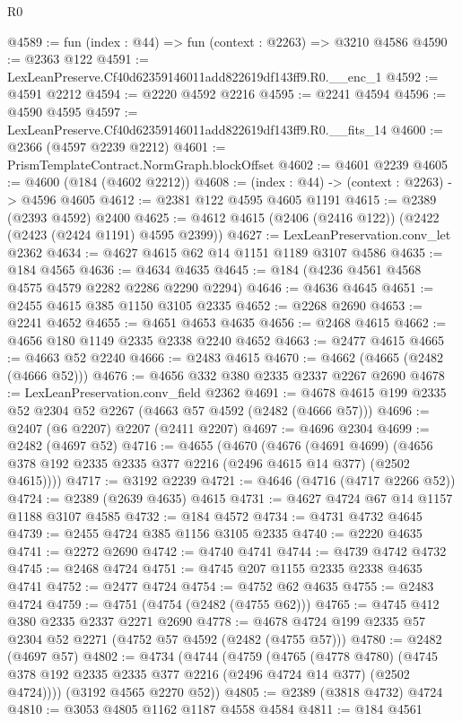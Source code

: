 \begin{lexlean}{R0}
\begin{coremodule}
@4589 := fun (index : @44) => fun (context : @2263) => @3210 @4586
@4590 := @2363 @122
@4591 := LexLeanPreserve.Cf40d62359146011add822619df143ff9.R0.__enc_1
@4592 := @4591 @2212
@4594 := @2220 @4592 @2216
@4595 := @2241 @4594
@4596 := @4590 @4595
@4597 := LexLeanPreserve.Cf40d62359146011add822619df143ff9.R0.__fits_14
@4600 := @2366 (@4597 @2239 @2212)
@4601 := PrismTemplateContract.NormGraph.blockOffset
@4602 := @4601 @2239
@4605 := @4600 (@184 (@4602 @2212))
@4608 := (index : @44) -> (context : @2263) -> @4596 @4605
@4612 := @2381 @122 @4595 @4605 @1191
@4615 := @2389 (@2393 @4592) @2400
@4625 := @4612 @4615 (@2406 (@2416 @122)) (@2422 (@2423 (@2424 @1191) @4595 @2399))
@4627 := LexLeanPreservation.conv_let @2362
@4634 := @4627 @4615 @62 @14 @1151 @1189 @3107 @4586
@4635 := @184 @4565
@4636 := @4634 @4635
@4645 := @184 (@4236 @4561 @4568 @4575 @4579 @2282 @2286 @2290 @2294)
@4646 := @4636 @4645
@4651 := @2455 @4615 @385 @1150 @3105 @2335
@4652 := @2268 @2690
@4653 := @2241 @4652
@4655 := @4651 @4653 @4635
@4656 := @2468 @4615
@4662 := @4656 @180 @1149 @2335 @2338 @2240 @4652
@4663 := @2477 @4615
@4665 := @4663 @52 @2240
@4666 := @2483 @4615
@4670 := @4662 (@4665 (@2482 (@4666 @52)))
@4676 := @4656 @332 @380 @2335 @2337 @2267 @2690
@4678 := LexLeanPreservation.conv_field @2362
@4691 := @4678 @4615 @199 @2335 @52 @2304 @52 @2267 (@4663 @57 @4592 (@2482 (@4666 @57)))
@4696 := @2407 (@6 @2207) @2207 (@2411 @2207)
@4697 := @4696 @2304
@4699 := @2482 (@4697 @52)
@4716 := @4655
    (@4670
      (@4676
        (@4691 @4699)
        (@4656 @378 @192 @2335 @2335 @377 @2216 (@2496 @4615 @14 @377) (@2502 @4615))))
@4717 := @3192 @2239
@4721 := @4646 (@4716 (@4717 @2266 @52))
@4724 := @2389 (@2639 @4635) @4615
@4731 := @4627 @4724 @67 @14 @1157 @1188 @3107 @4585
@4732 := @184 @4572
@4734 := @4731 @4732 @4645
@4739 := @2455 @4724 @385 @1156 @3105 @2335
@4740 := @2220 @4635
@4741 := @2272 @2690
@4742 := @4740 @4741
@4744 := @4739 @4742 @4732
@4745 := @2468 @4724
@4751 := @4745 @207 @1155 @2335 @2338 @4635 @4741
@4752 := @2477 @4724
@4754 := @4752 @62 @4635
@4755 := @2483 @4724
@4759 := @4751 (@4754 (@2482 (@4755 @62)))
@4765 := @4745 @412 @380 @2335 @2337 @2271 @2690
@4778 := @4678 @4724 @199 @2335 @57 @2304 @52 @2271 (@4752 @57 @4592 (@2482 (@4755 @57)))
@4780 := @2482 (@4697 @57)
@4802 := @4734
    (@4744
      (@4759
        (@4765
          (@4778 @4780)
          (@4745 @378 @192 @2335 @2335 @377 @2216 (@2496 @4724 @14 @377) (@2502 @4724))))
      (@3192 @4565 @2270 @52))
@4805 := @2389 (@3818 @4732) @4724
@4810 := @3053 @4805 @1162 @1187 @4558 @4584
@4811 := @184 @4561

\end{coremodule}
\end{lexlean}
